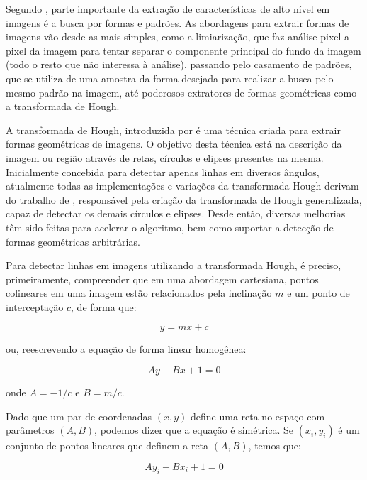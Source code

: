 Segundo , parte importante da extração de características de alto nível em imagens é a busca por formas e padrões. As abordagens para extrair formas de imagens vão desde as mais simples, como a limiarização, que faz análise pixel a pixel da imagem para tentar separar o componente principal do fundo da imagem (todo o resto que não interessa à análise), passando pelo casamento de padrões, que se utiliza de uma amostra da forma desejada para realizar a busca pelo mesmo padrão na imagem, até poderosos extratores de formas geométricas como a transformada de Hough.

A transformada de Hough, introduzida por  é uma técnica criada para extrair formas geométricas de imagens. O objetivo desta técnica está na descrição da imagem ou região através de retas, círculos e elipses presentes na mesma. Inicialmente concebida para detectar apenas linhas em diversos ângulos, atualmente todas as implementações e variações da transformada Hough derivam do trabalho de , responsável pela criação da transformada de Hough generalizada, capaz de detectar os demais círculos e elipses. Desde então, diversas melhorias têm sido feitas para acelerar o algoritmo, bem como suportar a detecção de formas geométricas arbitrárias.

Para detectar linhas em imagens utilizando a transformada Hough, é preciso, primeiramente, compreender que em uma abordagem cartesiana, pontos colineares em uma imagem estão relacionados pela inclinação $m$ e um ponto de interceptação $c$, de forma que:

\begin{equation}
	\displaystyle y = mx + c
\end{equation}

ou, reescrevendo a equação de forma linear homogênea:

\begin{equation}
	\displaystyle Ay + Bx + 1 = 0
\end{equation}

onde $A = -1/c$ e $B = m/c$.

Dado que um par de coordenadas $(x,y)$ define uma reta no espaço com parâmetros $(A,B)$, podemos dizer que a equação é simétrica. Se ${(x_i,y_i)}$ é um conjunto de pontos lineares que definem a reta $(A,B)$, temos que:

\begin{equation}
	\displaystyle Ay_i + Bx_i + 1 = 0
\end{equation}


